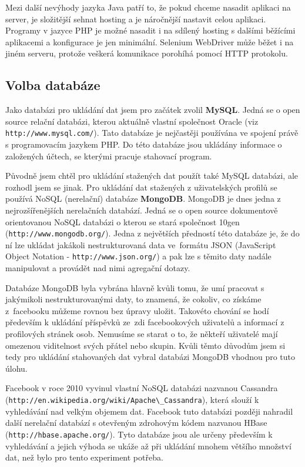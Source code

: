 \documentclass[thesis=M,czech]{FITthesis}[2013/05/10]
\begin{document}
Mezi další nevýhody jazyka Java patří to, že pokud chceme nasadit aplikaci na server, je složitější sehnat hosting a je náročnější nastavit celou aplikaci. Programy v jazyce PHP je možné nasadit i na sdílený hosting s dalšími běžícími aplikacemi a konfigurace je jen minimální. Selenium WebDriver může běžet i na jiném serveru, protože veškerá komunikace porohíhá pomocí HTTP protokolu.

\subsection{Volba databáze}

Jako databázi pro ukládání dat jsem pro začátek zvolil \textbf{MySQL}. Jedná se o open source relační databázi, kterou aktuálně vlastní společnost Oracle (viz \verb|http://www.mysql.com/|). Tato databáze je nejčastěji používána ve spojení právě s programovacím jazykem PHP. Do této databáze jsou ukládány informace o založených účtech, se kterými pracuje stahovací program.

Původně jsem chtěl pro ukládání stažených dat použít také MySQL databázi, ale rozhodl jsem se jinak. Pro ukládání dat stažených z uživatelských profilů se používá NoSQL (nerelační) databáze \textbf{MongoDB}. MongoDB je dnes jedna z nejrozšířenějších nerelačních databází. Jedná se o open source dokumentově orientovanou NoSQL databázi o kterou se stará společnost 10gen (\verb|http://www.mongodb.org/|). Jedna z největších předností této databáze je, že do ní lze ukládat jakákoli nestrukturovaná data ve~formátu JSON (JavaScript Object Notation - \verb|http://www.json.org/|) a pak lze s těmito daty nadále manipulovat a provádět nad nimi agregační dotazy. 

Databáze MongoDB byla vybrána hlavně kvůli tomu, že umí pracovat s jakýmikoli nestrukturovanými daty, to znamená, že cokoliv, co získáme z~facebooku můžeme rovnou bez úpravy uložit. Takovéto chování se hodí především k ukládání příspěvků ze~zdi facebookových uživatelů a informací z profilových stránek osob. Nemusíme se starat o to, že někteří uživatelé mají omezenou viditelnost svých přátel nebo skupin. Kvůli těmto důvodům jsem si tedy pro ukládání stahovaných dat vybral databázi MongoDB vhodnou pro tuto úlohu.

Facebook v roce 2010 vyvinul vlastní NoSQL databázi nazvanou Cassandra (\verb|http://en.wikipedia.org/wiki/Apache\_Cassandra|), která slouží k vyhledávání nad velkým objemem dat. Facebook tuto databázi později nahradil další nerelační databází  s otevřeným zdrohovým kódem nazvanou HBase (\verb|http://hbase.apache.org/|). Tyto databáze jsou ale určeny především k vyhledávání a jejich výhoda se ukáže až při ukládání mnohem většího množství dat, než bylo pro tento experiment potřeba.
\end{document}
